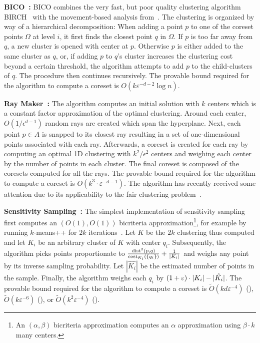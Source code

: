 {\bf BICO~\cite{FGSSS13}:} BICO combines the very fast, but poor quality clustering algorithm BIRCH~\cite{ZRL97} with the movement-based analysis from~\cite{FrahlS2005,HaM04}. The clustering is organized by way of a hierarchical decomposition: When adding a point $p$ to one of the coreset points $\Omega$ at level $i$, it first finds the closest point $q$ in $\Omega$. If $p$ is too far away from $q$, a new cluster is opened with center at $p$. Otherwise $p$ is either added to the same cluster as $q$, or, if adding $p$ to $q$'s cluster increases the clustering cost beyond a certain threshold, the algorithm attempts to add $p$ to the child-clusters of $q$. The procedure then continues recursively. The provable bound required for the algorithm to compute a coreset is $O\left(k\varepsilon^{-d-2}\log n\right)$.

{\bf Ray Maker~\cite{HaK07}:} The algorithm computes an initial solution with $k$ centers which is a constant factor approximation of the optimal clustering. Around each center, $O(1/\epsilon^{d-1})$ random rays are created which span the hyperplane. Next, each point $p \in A$ is snapped to its closest ray resulting in a set of one-dimensional points associated with each ray. Afterwards, a coreset is created for each ray by computing an optimal 1D clustering with $k^2/\epsilon^2$ centers and weighing each center by the number of points in each cluster. The final coreset is composed of the coresets computed for all the rays.
The provable bound required for the algorithm to compute a coreset is $O(k^3 \cdot \varepsilon^{-d-1})$. The algorithm has recently received some attention due to its applicability to the fair clustering problem~\cite{HuangJV19}.


{\bf Sensitivity Sampling~\cite{FeldmanL11}:} The simplest implementation of sensitivity sampling first computes an $(O(1),O(1))$ bicriteria approximation\footnote{An $(\alpha,\beta)$ bicriteria approximation computes an $\alpha$ approximation using $\beta\cdot k$ many centers.}, for example by running $k$-means++ for $2k$ iterations~\cite{Wei16}. Let $K$ be the $2k$ clustering thus computed and let $K_i$ be an arbitrary cluster of $K$ with center $q_i$. Subsequently, the algorithm picks points proportionate to $\frac{\text{dist}^2(p,q)}{\text{cost}_{K_i}(\{q_i\})} + \frac{1}{|K_i|}$ and weighs any point by its inverse sampling probability. Let $|\hat{K_i}|$ be the estimated number of points in the sample. Finally, the algorithm weighs each $q_i$ by $(1+\varepsilon)\cdot |K_i| - |\hat{K_i}|$. The provable bound required for the algorithm to compute a coreset is $\tilde O\left(kd\varepsilon^{-4}\right)$ (\cite{FeldmanL11}),
$\tilde O\left(k\varepsilon^{-6}\right)$ (\cite{huang2020coresets}), or $\tilde O\left(k^2\varepsilon^{-4}\right)$ (\cite{BravermanJKW21}).


